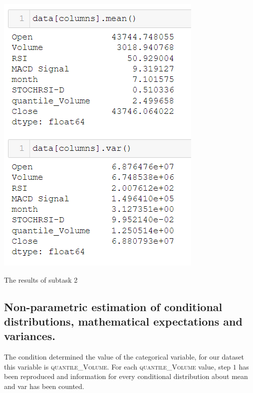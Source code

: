 \documentclass[%
12pt, %
final, %
oneside, %
onecolumn, %
centertags]{article} %
\theoremstyle{plain}
\theoremstyle{definition}
\theoremstyle{remark}
\begin{document}
\begin{center}
\includegraphics[scale=1]{images/mean_var.png}

The results of subtask 2
\end{center}

\newpage

\subsection{Non-parametric estimation of conditional distributions, mathematical expectations and variances.}

The condition determined the value of the categorical variable, for our dataset this variable is \textsc{quantile\_Volume}. For each \textsc{quantile\_Volume} value, step $1$ has been reproduced and information for every conditional distribution about mean and var has been counted.
\end{document}
